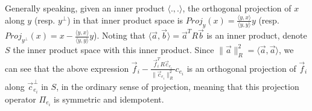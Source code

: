 
Generally speaking, given an inner product $\langle ., . \rangle$, the orthogonal projection of $x$ along $y$ (resp. $y^\perp$) in that inner product space is $Proj_y(x) = \frac{\langle y, x \rangle }{ \langle y , y\rangle}y$ (resp. $Proj_{y^\perp}(x) = x - \frac{\langle y, x \rangle}{ \langle y , y\rangle}y$). Noting that $\langle \overrightarrow a , \overrightarrow b \rangle = \overrightarrow a^T R\overrightarrow b$ is an inner product, denote $S$ the inner product space with this inner product. Since $\| \overrightarrow a \|^2_R = \langle \overrightarrow a, \overrightarrow a \rangle$, we can see that the above expression $\overrightarrow f_i - \frac{\overrightarrow f_i^T R \overrightarrow c_{e_i}  }{\| \overrightarrow c_{e_i}\|^2_R} c_{e_i}$ is an orthogonal projection of $\overrightarrow f_i$ along $\overrightarrow c_{e_i}^\perp$ in $S$, in the ordinary sense of projection, meaning that this projection operator $\Pi_{e_i}$ is symmetric and idempotent. 